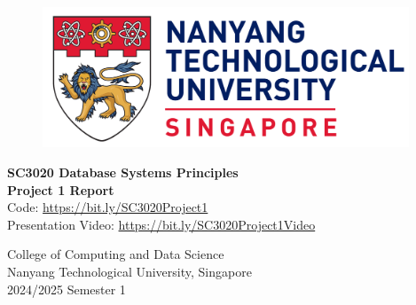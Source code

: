 \begin{titlepage}
	\begin{figure}[!t]
		\centering
		\includegraphics[width = 4.3in]{title/logo.pdf}
	\end{figure}
	
	\centering
	\huge{\textbf{SC3020 Database Systems Principles}}\\[0.2in]
	\huge{\textbf{Project 1 Report}}\\[2in]
        \small {Code: \url{https://bit.ly/SC3020Project1}} \\
        \small {Presentation Video: \url{https://bit.ly/SC3020Project1Video}}
	
	
	\begin{table}[h]
		\centering
	\end{table}

	
	
    
	
	
	\vspace{0.5in}
    \LARGE{College of Computing and Data Science}\\
	\LARGE{Nanyang Technological University, Singapore}\\[0.3in]
	
	
	\LARGE{2024/2025 Semester 1}
	\newpage
\end{titlepage}